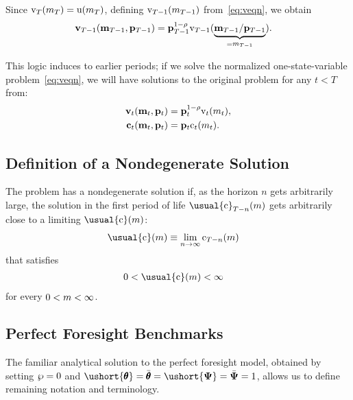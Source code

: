 \documentclass[BufferStockTheory]{subfiles}
\begin{document}
Since $\mathrm{v}_{T}(m_{T}) = \mathrm{u}(m_{T})$, defining $\mathrm{v}_{T-1}(m_{T-1})$ from~\eqref{eq:veqn}, we obtain
\begin{align*}
  \mathbf{v}_{T-1}(\mathbf{m}_{T-1},\mathbf{p}_{T-1})  & = \mathbf{p}_{T-1}^{1-{\rho}} \mathrm{v}_{T-1}(\underbrace{\mathbf{m}_{T-1}/\mathbf{p}_{T-1}}_{=m_{T-1}}).
\end{align*}

This logic induces to earlier periods; if we solve the normalized one-state-variable problem~\eqref{eq:veqn}, we will have solutions to the original problem for any $t<T$ from:
\begin{align*}
  \mathbf{v}_{t}(\mathbf{m}_{t},\mathbf{p}_{t})  & = \mathbf{p}_{t}^{1-{\rho}}\mathrm{v}_{t}(m_{t}),
  \\ \mathbf{c}_{t}(\mathbf{m}_{t},\mathbf{p}_{t})  & = \mathbf{p}_{t}\mathrm{c}_{t}(m_{t}).
\end{align*}

\hypertarget{Definition-of-a-Nondegenerate-Solution}{}
\subsection{Definition of a Nondegenerate Solution}

The problem has a nondegenerate solution if, as the horizon $n$ gets arbitrarily large, the solution in the first period of life $\usual{\cFunc}_{T-n}(\mNrm)$ gets arbitrarily close to a limiting $\usual{\cFunc}(\mNrm)$:
\begin{align*}
  \usual{\cFunc}(\mNrm)  & \equiv  \lim_{n \rightarrow \infty} \cFunc_{T-n}(\mNrm) \notag
\end{align*}
that satisfies
\begin{align}
  0 & < \usual{\cFunc}(\mNrm) <  \infty
\end{align}
for every $0 < m < \infty$.

\hypertarget{Perfect-Foresight-Benchmarks}{}
\subsection{Perfect Foresight Benchmarks}

The familiar analytical solution to the perfect foresight model, obtained by setting ${\wp}=0$ and $\ushort{\TranShkEmp}=\bar{\TranShkEmp}=\ushort{\PermShk}=\bar{\PermShk}=1$, allows us to define remaining notation and terminology.

\hypertarget{Human-Wealth}{}\hypertarget{hNrmDefn}{}
\end{document}
